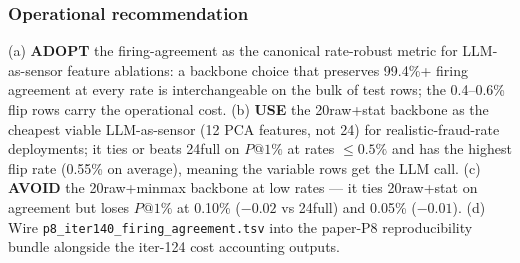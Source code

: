 \subsubsection{Operational recommendation}
(a) \textbf{ADOPT} the firing-agreement as the canonical rate-robust
metric for LLM-as-sensor feature ablations: a backbone choice that
preserves 99.4\%+ firing agreement at every rate is interchangeable
on the bulk of test rows; the 0.4--0.6\% flip rows carry the
operational cost.  (b) \textbf{USE} the 20raw+stat backbone as the
cheapest viable LLM-as-sensor (12 PCA features, not 24) for
realistic-fraud-rate deployments; it ties or beats 24full on $P@1\%$
at rates $\le 0.5\%$ and has the highest flip rate (0.55\% on
average), meaning the variable rows get the LLM call.  (c)
\textbf{AVOID} the 20raw+minmax backbone at low rates --- it ties
20raw+stat on agreement but loses $P@1\%$ at 0.10\% ($-0.02$ vs
24full) and 0.05\% ($-0.01$).  (d) Wire
\texttt{p8\_iter140\_firing\_agreement.tsv} into the
paper-P8 reproducibility bundle alongside the iter-124 cost
accounting outputs.

